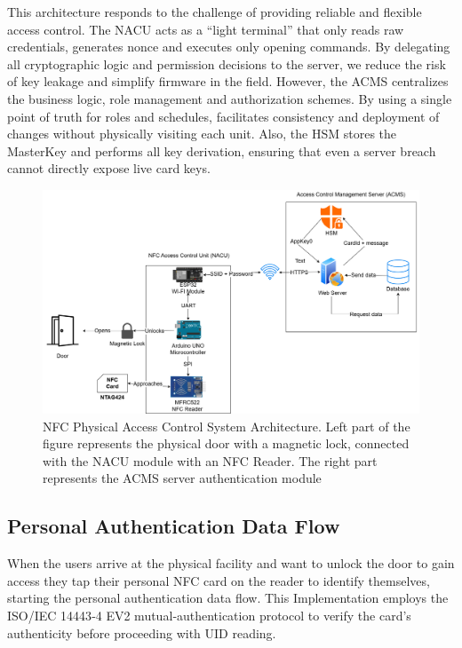 This architecture responds to the challenge of providing reliable and flexible access
control. The NACU acts as a “light terminal” \cite{ref62} that only reads raw credentials,
generates nonce and executes only opening commands. By delegating all
cryptographic logic and permission decisions to the server, we reduce the risk of key
leakage and simplify firmware in the field.
However, the ACMS centralizes the business logic, role management and
authorization schemes. By using a single point of truth for roles and schedules,
facilitates consistency and deployment of changes without physically visiting each
unit. Also, the HSM stores the MasterKey and performs all key derivation, ensuring
that even a server breach cannot directly expose live card keys.

\begin{figure}[H]
	\centering
	\includegraphics[width=\textwidth]{imaxes/Arqu.png}
	\caption{NFC Physical Access Control System Architecture. Left part of the figure represents the physical door with a
		magnetic lock, connected with the NACU module with an NFC Reader. The right part represents the ACMS server
		authentication module}
	\label{fig:arch}
\end{figure}

\subsection{Personal Authentication Data Flow}

When the users arrive at the physical facility and want to unlock the door to gain
access they tap their personal NFC card on the reader to identify themselves,
starting the personal authentication data flow. This Implementation employs the
ISO/IEC 14443‑4 EV2 mutual‑authentication protocol to verify the card’s authenticity
before proceeding with UID reading. 

